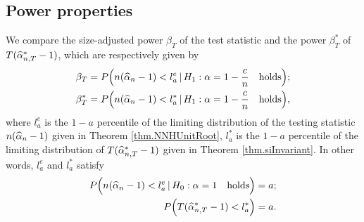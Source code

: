 \subsection{Power properties}

We compare the size-adjusted power $\beta_T$ of the test statistic and the power $\beta^*_T$ of $T(\widehat{\alpha}_{n,T}^* - 1)$, which are respectively given by
\begin{align}
\beta_T & = P \Big ( n(\widehat{\alpha}_n - 1) < l^e_a \, | \, H_1 : \alpha = 1 - \frac{c}{n} \quad \mbox{holds} \Big ); \nonumber\\
\beta_T^* & = P \Big ( n(\widehat{\alpha}_n - 1) < l^*_a \, | \, H_1 : \alpha = 1 - \frac{c}{n} \quad \mbox{holds} \Big ),
\end{align}
where $l^e_a$ is the $1 - a$ percentile of the limiting distribution of the testing statistic $n(\widehat{\alpha}_n - 1)$ given in Theorem \ref{thm.NNHUnitRoot}, $l^*_a$ is the $1 - a$ percentile of the limiting distribution of $T(\widehat{\alpha}^{*}_{n,T} - 1)$ given in Theorem \ref{thm.siInvariant}. In other words, $l^e_a$ and $l^*_a$ satisfy
\begin{align}
P \Big ( n(\widehat{\alpha}_n - 1) < l^e_a \, | \, H_0 : \alpha = 1 \quad \mbox{holds} \Big )&= a; \nonumber\\
P \Big ( T(\widehat{\alpha}^*_{n,T}-1) < l^*_a  \Big ) &= a.
\end{align}

